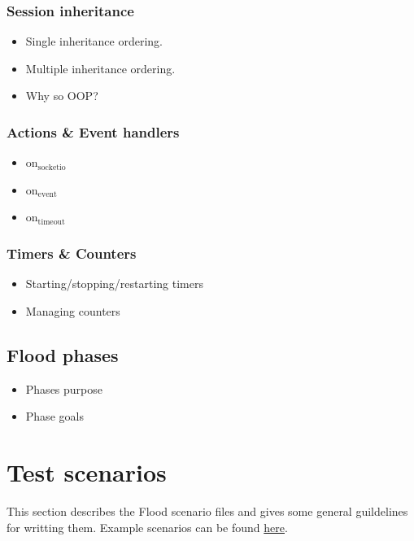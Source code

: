 \documentclass[a4paper]{article}
\begin{document}
\subsubsection{Session inheritance}
\label{sec-2-2-2}


\begin{itemize}
\item Single inheritance ordering.
\item Multiple inheritance ordering.
\item Why so OOP?
\end{itemize}
\subsubsection{Actions \& Event handlers}
\label{sec-2-2-3}


\begin{itemize}
\item on$_{\mathrm{socketio}}$
\item on$_{\mathrm{event}}$
\item on$_{\mathrm{timeout}}$
\end{itemize}
\subsubsection{Timers \& Counters}
\label{sec-2-2-4}


\begin{itemize}
\item Starting/stopping/restarting timers
\item Managing counters
\end{itemize}
\subsection{Flood phases}
\label{sec-2-3}
\label{ref-goals}



\begin{itemize}
\item Phases purpose
\item Phase goals
\end{itemize}

\pagebreak
\section{Test scenarios}
\label{sec-3}

This section describes the Flood scenario files and gives some general guildelines for writting them. Example scenarios can be found \hyperref[sec-3-7]{here}.
\end{document}
